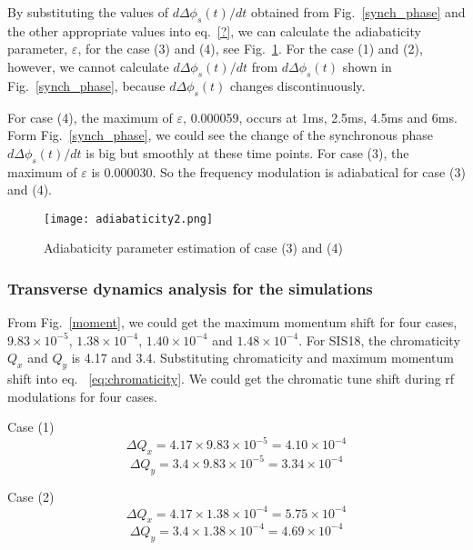 \begin{itemize}
By substituting the values of $d\Delta \phi_s(t)/dt$ obtained from Fig.~\ref{synch_phase} and the other appropriate values into eq.~\ref{?}, we can calculate the adiabaticity parameter, $\varepsilon$, for the case (3) and (4), see Fig.~\ref{adiabaticity2}. For the case (1) and (2), however, we cannot calculate $d\Delta \phi_s(t)/dt$ from $d\Delta \phi_s(t)$  shown in Fig.~\ref{synch_phase}, because $d\Delta \phi_s(t)$ changes discontinuously. 

For case (4), the maximum of $\varepsilon$, 0.000059, occurs at 1ms, 2.5ms, 4.5ms and 6ms. Form Fig.~\ref{synch_phase}, we could see the change of the synchronous phase $d\Delta \phi_s(t)/dt$  is big but smoothly at these time points. For case (3), the maximum of $\varepsilon$ is 0.000030. So the frequency modulation is adiabatical for case (3) and (4).


\begin{figure}[!htb]
   \centering   
   \texttt{[image: adiabaticity2.png]}
   \caption{Adiabaticity parameter estimation of case (3) and (4)}
   \label{adiabaticity2}
\end{figure}
\end{itemize}
\subsubsection{Transverse dynamics analysis for the simulations}
From Fig.~\ref{moment}, we could get the maximum momentum shift for four cases, $9.83 \times 10^{-5}$, $1.38 \times 10^{-4}$, $1.40 \times 10^{-4}$ and $1.48 \times 10^{-4}$. For SIS18, the chromaticity $Q_x$ and $Q_y$ is 4.17 and 3.4. Substituting chromaticity and maximum momentum shift into eq. ~\ref{eq:chromaticity}. We could get the chromatic tune shift during rf modulations for four cases. 

Case (1) 
\begin{equation}
\Delta Q_x = 4.17 \times 9.83 \times 10^{-5}=4.10 \times 10^{-4}
\end{equation}
\begin{equation}
\Delta Q_y = 3.4 \times 9.83 \times 10^{-5}=3.34 \times 10^{-4} 
\end{equation}

Case (2)
\begin{equation}
\Delta Q_x = 4.17 \times 1.38 \times 10^{-4}=5.75 \times 10^{-4}
\end{equation}
\begin{equation}
\Delta Q_y = 3.4 \times 1.38 \times 10^{-4}=4.69 \times 10^{-4} 
\end{equation}

